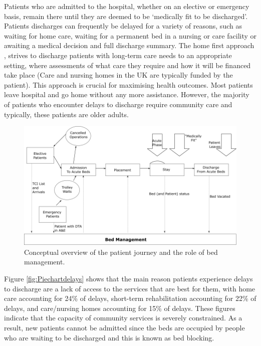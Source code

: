 \documentclass[../thesis.tex]{subfiles}
\begin{document}
Patients who are admitted to the hospital, whether on an elective or emergency basis, remain there until they are deemed to be `medically fit to be discharged'. Patients discharges can frequently be delayed for a variety of reasons, such as waiting for home care, waiting for a permanent bed in a nursing or care facility  or awaiting a medical decision and full discharge summary. The home first approach \cite{NHSEnglandb}, strives to discharge patients with long-term care needs to an appropriate setting, where assessments of what care they require and how it will be financed take place (Care and nursing homes in the UK are typically funded by the patient). This approach is crucial for maximising health outcomes. Most patients leave hospital and go home without any more assistance. However, the majority of patients who encounter delays to discharge require community care and typically, these patients are older adults.

\begin{figure}[h!]
    \centering
    \includegraphics[scale=0.6]{Chapters/Chapter1/Figures/bedmanagement.png}
    \caption{Conceptual overview of the patient journey and the role of bed management.} %
    \label{fig:bedmanagement}
\end{figure}



Figure \ref{fig:Piechartdelays} shows that the main reason patients experience delays to discharge are a lack of access to the services that are best for them, with home care accounting for 24\% of delays, short-term rehabilitation accounting for 22\% of delays, and care/nursing homes accounting for 15\% of delays. These figures indicate that the capacity of community services is severely constrained. As a result, new patients cannot be admitted since the beds are occupied by people who are waiting to be discharged and this is known as bed blocking.
\end{document}
